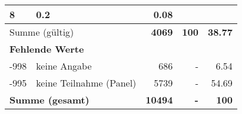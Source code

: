 \begin{longtable}{lXrrr}
       \num{8} &
       \num[round-mode=places,round-precision=2]{0,2} &
         \num[round-mode=places,round-precision=2]{0,08} \\
     \midrule
     \multicolumn{2}{l}{Summe (gültig)} &
       \textbf{\num{4069}} &
     \textbf{100} &
       \textbf{\num[round-mode=places,round-precision=2]{38,77}} \\
     \multicolumn{5}{l}{\textbf{Fehlende Werte}}\\
       -998 &
       keine Angabe &
         \num{686} &
        - &
         \num[round-mode=places,round-precision=2]{6,54} \\
       -995 &
       keine Teilnahme (Panel) &
         \num{5739} &
        - &
         \num[round-mode=places,round-precision=2]{54,69} \\
     \midrule
     \multicolumn{2}{l}{\textbf{Summe (gesamt)}} &
          \textbf{\num{10494}} &
        \textbf{-} &
        \textbf{100} \\
     \bottomrule
     \end{longtable}
     
